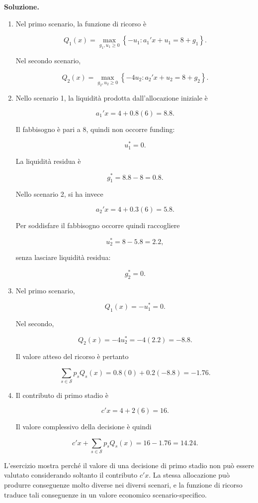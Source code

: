 \noindent
\textbf{Soluzione.}

\begin{enumerate}

\item Nel primo scenario, la funzione di ricorso \`e

\[
Q_1(x)
=
\max_{g_1,u_1\geq0}
\left\{
-u_1:
a_1'x+u_1=8+g_1
\right\}.
\]

Nel secondo scenario,

\[
Q_2(x)
=
\max_{g_2,u_2\geq0}
\left\{
-4u_2:
a_2'x+u_2=8+g_2
\right\}.
\]

\item Nello scenario 1, la liquidit\`a prodotta dall'allocazione iniziale \`e

\[
a_1'x
=
4+0.8(6)
=
8.8.
\]

Il fabbisogno \`e pari a $8$, quindi non occorre funding:

\[
u_1^*=0.
\]

La liquidit\`a residua \`e

\[
g_1^*
=
8.8-8
=
0.8.
\]

Nello scenario 2, si ha invece

\[
a_2'x
=
4+0.3(6)
=
5.8.
\]

Per soddisfare il fabbisogno occorre quindi raccogliere

\[
u_2^*
=
8-5.8
=
2.2,
\]

senza lasciare liquidit\`a residua:

\[
g_2^*=0.
\]

\item Nel primo scenario,

\[
Q_1(x)
=
-u_1^*
=
0.
\]

Nel secondo,

\[
Q_2(x)
=
-4u_2^*
=
-4(2.2)
=
-8.8.
\]

Il valore atteso del ricorso \`e pertanto

\[
\sum_{s\in\mathcal S}p_sQ_s(x)
=
0.8(0)+0.2(-8.8)
=
-1.76.
\]

\item Il contributo di primo stadio \`e

\[
c'x
=
4+2(6)
=
16.
\]

Il valore complessivo della decisione \`e quindi

\[
c'x
+
\sum_{s\in\mathcal S}p_sQ_s(x)
=
16-1.76
=
14.24.
\]

\end{enumerate}

L'esercizio mostra perch\'e il valore di una decisione di primo stadio non
pu\`o essere valutato considerando soltanto il contributo $c'x$. La stessa
allocazione pu\`o produrre conseguenze molto diverse nei diversi scenari, e la
funzione di ricorso traduce tali conseguenze in un valore economico
scenario-specifico.


